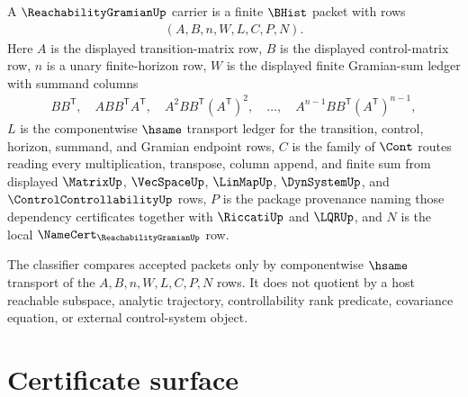 \begin{definition}
\label{def:reachability-gramian-carrier}
A $\ReachabilityGramianUp$ carrier is a finite $\BHist$ packet with rows
$$
\begin{aligned}
(A,B,n,W,L,C,P,N).
\end{aligned}
$$
Here $A$ is the displayed transition-matrix row, $B$ is the displayed control-matrix row, $n$ is a unary finite-horizon row, $W$ is the displayed finite Gramian-sum ledger with summand columns
$$
\begin{aligned}
BB^{\mathsf T},\quad ABB^{\mathsf T}A^{\mathsf T},\quad A^2BB^{\mathsf T}(A^{\mathsf T})^2,\quad \ldots,\quad A^{n-1}BB^{\mathsf T}(A^{\mathsf T})^{n-1},
\end{aligned}
$$
$L$ is the componentwise $\hsame$ transport ledger for the transition, control, horizon, summand, and Gramian endpoint rows, $C$ is the family of $\Cont$ routes reading every multiplication, transpose, column append, and finite sum from displayed $\MatrixUp$, $\VecSpaceUp$, $\LinMapUp$, $\DynSystemUp$, and $\ControlControllabilityUp$ rows, $P$ is the package provenance naming those dependency certificates together with $\RiccatiUp$ and $\LQRUp$, and $N$ is the local $\NameCert_{\ReachabilityGramianUp}$ row.

The classifier compares accepted packets only by componentwise $\hsame$ transport of the $A,B,n,W,L,C,P,N$ rows. It does not quotient by a host reachable subspace, analytic trajectory, controllability rank predicate, covariance equation, or external control-system object.
\end{definition}

\section{Certificate surface}
\label{sec:reachability-gramian-certificate}

